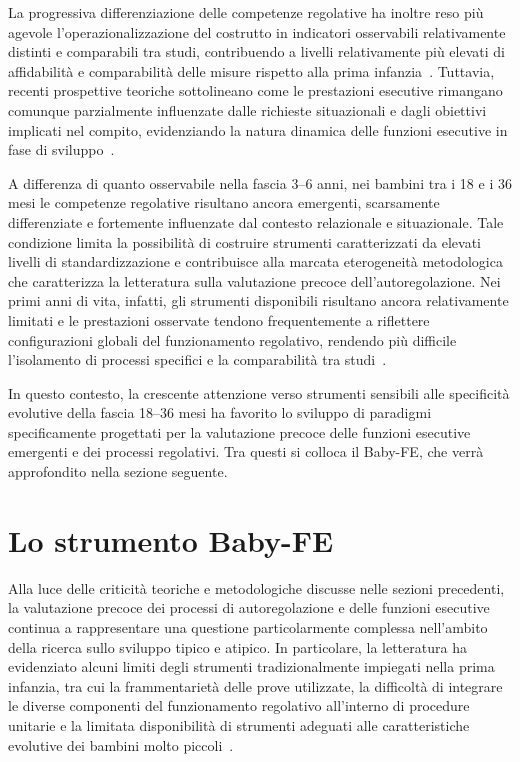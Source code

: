         La progressiva differenziazione delle competenze regolative ha inoltre reso più agevole l'operazionalizzazione del costrutto in indicatori osservabili relativamente distinti e comparabili tra studi, contribuendo a livelli relativamente più elevati di affidabilità e comparabilità delle misure rispetto alla prima infanzia~\cite{hughes2002}. Tuttavia, recenti prospettive teoriche sottolineano come le prestazioni esecutive rimangano comunque parzialmente influenzate dalle richieste situazionali e dagli obiettivi implicati nel compito, evidenziando la natura dinamica delle funzioni esecutive in fase di sviluppo~\cite{doebel2020}.

        A differenza di quanto osservabile nella fascia 3--6 anni, nei bambini tra i 18 e i 36 mesi le competenze regolative risultano ancora emergenti, scarsamente differenziate e fortemente influenzate dal contesto relazionale e situazionale. Tale condizione limita la possibilità di costruire strumenti caratterizzati da elevati livelli di standardizzazione e contribuisce alla marcata eterogeneità metodologica che caratterizza la letteratura sulla valutazione precoce dell'autoregolazione. Nei primi anni di vita, infatti, gli strumenti disponibili risultano ancora relativamente limitati e le prestazioni osservate tendono frequentemente a riflettere configurazioni globali del funzionamento regolativo, rendendo più difficile l'isolamento di processi specifici e la comparabilità tra studi~\cite{hughes2002,berni2025}.

        In questo contesto, la crescente attenzione verso strumenti sensibili alle specificità evolutive della fascia 18--36 mesi ha favorito lo sviluppo di paradigmi specificamente progettati per la valutazione precoce delle funzioni esecutive emergenti e dei processi regolativi. Tra questi si colloca il Baby-FE, che verrà approfondito nella sezione seguente.

    \section{Lo strumento Baby-FE}
    \label{sec:3_7}

        Alla luce delle criticità teoriche e metodologiche discusse nelle sezioni precedenti, la valutazione precoce dei processi di autoregolazione e delle funzioni esecutive continua a rappresentare una questione particolarmente complessa nell'ambito della ricerca sullo sviluppo tipico e atipico. In particolare, la letteratura ha evidenziato alcuni limiti degli strumenti tradizionalmente impiegati nella prima infanzia, tra cui la frammentarietà delle prove utilizzate, la difficoltà di integrare le diverse componenti del funzionamento regolativo all'interno di procedure unitarie e la limitata disponibilità di strumenti adeguati alle caratteristiche evolutive dei bambini molto piccoli~\cite{blair2015,garon2008}.

